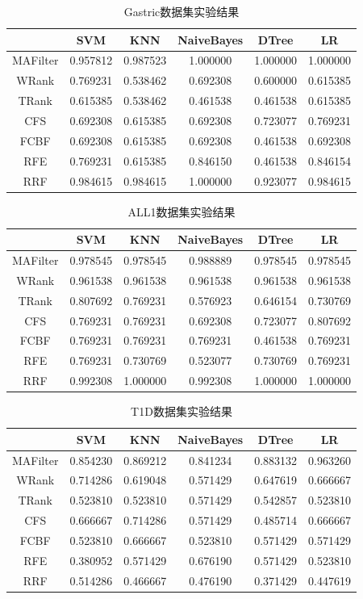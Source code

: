 \documentclass{njubachelor}
\begin{document}
\begin{table}        
\centering
\caption{Gastric数据集实验结果}
\begin{tabular}{cccccc}
\hline
  & SVM & KNN & NaiveBayes & DTree & LR\\
\hline
MAFilter&	0.957812&	0.987523&	1.000000&	1.000000&	1.000000\\
WRank	&0.769231&	0.538462&	0.692308&	0.600000	&0.615385\\
TRank	&0.615385&	0.538462&	0.461538&	0.461538&	0.615385\\
CFS	&0.692308&	0.615385&	0.692308&	0.723077	&0.769231\\
FCBF&	0.692308&	0.615385&	0.692308&	0.461538&	0.692308\\
RFE&	0.769231&	0.615385&	0.846150&	0.461538&	0.846154\\
RRF&	0.984615&	0.984615&	1.000000&	0.923077&	0.984615\\
\hline
\end{tabular}
\end{table}

\begin{table}        
\centering
\caption{ALL1数据集实验结果}
\begin{tabular}{cccccc}
\hline
  & SVM & KNN & NaiveBayes & DTree & LR\\
\hline
MAFilter&	0.978545&	0.978545&	0.988889&	0.978545&	0.978545\\
WRank	&0.961538&	0.961538&	0.961538&	0.961538&	0.961538\\
TRank	&0.807692&	0.769231&	0.576923&	0.646154&	0.730769\\
CFS	&0.769231	&0.769231&	0.692308	&0.723077&	0.807692\\
FCBF&	0.769231&	0.769231&	0.769231&	0.461538&	0.769231\\
RFE&	0.769231&	0.730769&	0.523077&	0.730769&	0.769231\\
RRF&	0.992308&	1.000000&	0.992308&	1.000000&	1.000000\\
\hline
\end{tabular}
\end{table}

\begin{table}        
\centering
\caption{T1D数据集实验结果}
\begin{tabular}{cccccc}
\hline
  & SVM & KNN & NaiveBayes & DTree & LR\\
\hline
MAFilter&0.854230&	0.869212&	0.841234&	0.883132&	0.963260\\
WRank&	0.714286&	0.619048&	0.571429&	0.647619&	0.666667\\
TRank&	0.523810&	0.523810&	0.571429&	0.542857&	0.523810\\
CFS&	0.666667&	0.714286&	0.571429&	0.485714&	0.666667\\
FCBF&	0.523810&	0.666667&	0.523810&	0.571429&	0.571429\\
RFE&	0.380952&	0.571429&	0.676190&	0.571429&	0.523810\\
RRF&	0.514286&	0.466667&	0.476190&	0.371429&	0.447619\\
\hline
\end{tabular}
\end{table}
\end{document}
